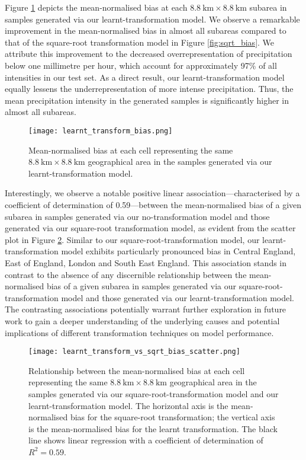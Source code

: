 \documentclass[ oneside,%
                    author={George Herbert},
                    degree={MSci},
                     title={Diffusion Models for Time-Evolving Precipitation Fields},
                  subtitle={}]{dissertation}
\begin{document}
Figure \ref{fig:learnt_transform_bias} depicts the mean-normalised bias at each $8.8\ \mathrm{km}\times 8.8\ \mathrm{km}$ subarea in samples generated via our learnt-transformation model. We observe a remarkable improvement in the mean-normalised bias in almost all subareas compared to that of the square-root transformation model in Figure \ref{fig:sqrt_bias}. We attribute this improvement to the decreased overrepresentation of precipitation below one millimetre per hour, which account for approximately 97\% of all intensities in our test set. As a direct result, our learnt-transformation model equally lessens the underrepresentation of more intense precipitation. Thus, the mean precipitation intensity in the generated samples is significantly higher in almost all subareas. 

\begin{figure}[htbp]
      \centering
      \texttt{[image: learnt\_transform\_bias.png]}
      \caption{Mean-normalised bias at each cell representing the same $8.8\ \mathrm{km}\times 8.8\ \mathrm{km}$ geographical area in the samples generated via our learnt-transformation model.}
      \label{fig:learnt_transform_bias}
\end{figure}

Interestingly, we observe a notable positive linear association---characterised by a coefficient of determination of 0.59---between the mean-normalised bias of a given subarea in samples generated via our no-transformation model and those generated via our square-root transformation model, as evident from the scatter plot in Figure \ref{fig:learnt_transform_vs_sqrt_bias_scatter}. Similar to our square-root-transformation model, our learnt-transformation model exhibits particularly pronounced bias in Central England, East of England, London and South East England. This association stands in contrast to the absence of any discernible relationship between the mean-normalised bias of a given subarea in samples generated via our square-root-transformation model and those generated via our learnt-transformation model. The contrasting associations potentially warrant further exploration in future work to gain a deeper understanding of the underlying causes and potential implications of different transformation techniques on model performance.

\begin{figure}[htbp]
      \centering
      \texttt{[image: learnt\_transform\_vs\_sqrt\_bias\_scatter.png]}
      \caption{Relationship between the mean-normalised bias at each cell representing the same $8.8\ \mathrm{km}\times 8.8\ \mathrm{km}$ geographical area in the samples generated via our square-root-transformation model and our learnt-transformation model. The horizontal axis is the mean-normalised bias for the square-root transformation; the vertical axis is the mean-normalised bias for the learnt transformation. The black line shows linear regression with a coefficient of determination of $R^2 = 0.59$.}
      \label{fig:learnt_transform_vs_sqrt_bias_scatter}
\end{figure}
\end{document}
